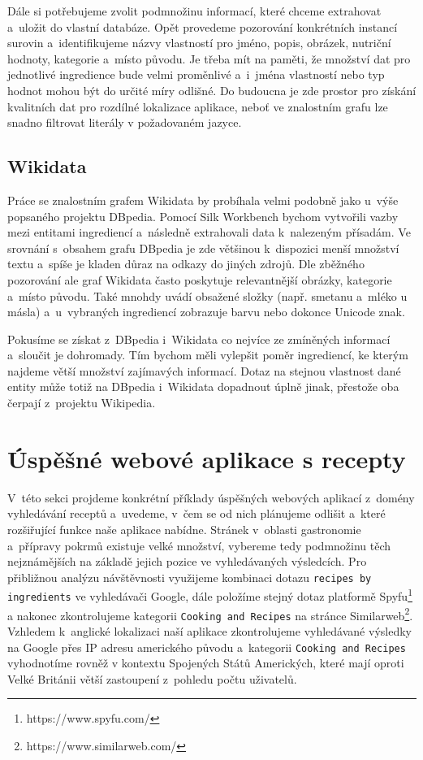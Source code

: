Dále si potřebujeme zvolit podmnožinu informací, které chceme extrahovat a~uložit do vlastní databáze. Opět provedeme pozorování konkrétních instancí surovin a~identifikujeme názvy vlastností pro jméno, popis, obrázek, nutriční hodnoty, kategorie a~místo původu. Je třeba mít na paměti, že množství dat pro jednotlivé ingredience bude velmi proměnlivé a~i~jména vlastností nebo typ hodnot mohou být do určité míry odlišné. Do budoucna je zde prostor pro získání kvalitních dat pro rozdílné lokalizace aplikace, neboť ve znalostním grafu lze snadno filtrovat literály v požadovaném jazyce.

\subsection{Wikidata}

Práce se znalostním grafem Wikidata by probíhala velmi podobně jako u~výše popsaného projektu DBpedia. Pomocí Silk Workbench bychom vytvořili vazby mezi entitami ingrediencí a~následně extrahovali data k~nalezeným přísadám. Ve srovnání s~obsahem grafu DBpedia je zde většinou k~dispozici menší množství textu a~spíše je kladen důraz na odkazy do jiných zdrojů. Dle zběžného pozorování ale graf Wikidata často poskytuje relevantnější obrázky, kategorie a~místo původu. Také mnohdy uvádí obsažené složky (např. smetanu a~mléko u másla) a~u~vybraných ingrediencí zobrazuje barvu nebo dokonce Unicode znak.

Pokusíme se získat z~DBpedia i~Wikidata co nejvíce ze zmíněných informací a~sloučit je dohromady. Tím bychom měli vylepšit poměr ingrediencí, ke kterým najdeme větší množství zajímavých informací. Dotaz na stejnou vlastnost dané entity může totiž na DBpedia i~Wikidata dopadnout úplně jinak, přestože oba čerpají z~projektu Wikipedia.

\section{Úspěšné webové aplikace s recepty}

V~této sekci projdeme konkrétní příklady úspěšných webových aplikací z~domény vyhledávání receptů a~uvedeme, v~čem se od nich plánujeme odlišit a~které rozšiřující funkce naše aplikace nabídne. Stránek v~oblasti gastronomie a~přípravy pokrmů existuje velké množství, vybereme tedy podmnožinu těch nejznámějších na základě jejich pozice ve vyhledávaných výsledcích. Pro přibližnou analýzu návštěvnosti využijeme kombinaci dotazu \texttt{recipes by ingredients} ve vyhledávači Google, dále položíme stejný dotaz platformě Spyfu\footnote{https://www.spyfu.com/} a nakonec zkontrolujeme kategorii \texttt{Cooking and Recipes} na stránce Similarweb\footnote{https://www.similarweb.com/}. Vzhledem k~anglické lokalizaci naší aplikace zkontrolujeme vyhledávané výsledky na Google přes IP adresu amerického původu a~kategorii \texttt{Cooking and Recipes} vyhodnotíme rovněž v kontextu Spojených Států Amerických, které mají oproti Velké Británii větší zastoupení z~pohledu počtu uživatelů.

